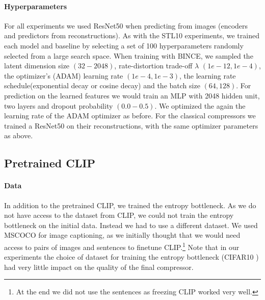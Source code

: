 \documentclass[final]{article}
\begin{document}
\paragraph{Hyperparameters}
For all experiments we used ResNet50 when predicting from images (\ie encoders and predictors from reconstructions).
As with the STL10 experiments, we trained each model and baseline by selecting a set of 100 hyperparameters randomly selected from a large search space.
When training with BINCE, we sampled the latent dimension size $(32-2048)$, rate-distortion trade-off $\lambda$ $(1e-12,1e-4)$, the optimizer's (ADAM) learning rate $(1e-4,1e-3)$, the learning rate schedule(exponential decay or cosine decay) and the batch size $(64,128)$. For prediction on the learned features we would train an MLP with 2048 hidden unit, two layers and dropout probability $(0.0-0.5)$. We optimized the again the learning rate of the ADAM optimizer as before.
For the classical compressors we trained a ResNet50 on their reconstructions, with the same optimizer parameters as above.

\subsection{Pretrained CLIP}
\label{appx:reproducability_clip}


\paragraph{Data}
In addition to the pretrained CLIP, we trained the entropy bottleneck.
As we do not have access to the dataset from CLIP, we could not train the entropy bottleneck on the initial data.
Instead we had to use a different dataset.
We used MSCOCO \cite{lin_microsoft_2015} for image captioning, as we initially thought that we would need access to pairs of images and sentences to finetune CLIP.\footnote{
At the end we did not use the sentences as freezing CLIP worked very well.}
Note that in our experiments the choice of dataset for training the entropy bottleneck (\eg CIFAR10 \cite{krizhevsky_learning_2009}) had very little impact on the quality of the final compressor.
\end{document}
